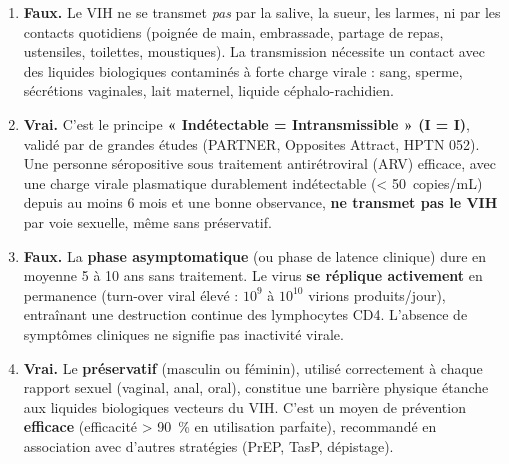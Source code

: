\documentclass[11pt]{article}
\begin{document}
\begin{corrige}
\begin{enumerate}
\item \textbf{Faux.} Le VIH ne se transmet \emph{pas} par la salive, la sueur, les larmes, ni par les contacts quotidiens (poignée de main, embrassade, partage de repas, ustensiles, toilettes, moustiques). La transmission nécessite un contact avec des liquides biologiques contaminés à forte charge virale : sang, sperme, sécrétions vaginales, lait maternel, liquide céphalo-rachidien.
\item \textbf{Vrai.} C'est le principe \textbf{« Indétectable = Intransmissible » (I = I)}, validé par de grandes études (PARTNER, Opposites Attract, HPTN 052). Une personne séropositive sous traitement antirétroviral (ARV) efficace, avec une charge virale plasmatique durablement indétectable (< \SI{50}{copies/mL}) depuis au moins 6 mois et une bonne observance, \textbf{ne transmet pas le VIH} par voie sexuelle, même sans préservatif.
\item \textbf{Faux.} La \textbf{phase asymptomatique} (ou phase de latence clinique) dure en moyenne 5 à 10 ans sans traitement. Le virus \textbf{se réplique activement} en permanence (turn-over viral élevé : $10^9$ à $10^{10}$ virions produits/jour), entraînant une destruction continue des lymphocytes CD4. L'absence de symptômes cliniques ne signifie pas inactivité virale.
\item \textbf{Vrai.} Le \textbf{préservatif} (masculin ou féminin), utilisé correctement à chaque rapport sexuel (vaginal, anal, oral), constitue une barrière physique étanche aux liquides biologiques vecteurs du VIH. C'est un moyen de prévention \textbf{efficace} (efficacité > \SI{90}{\%} en utilisation parfaite), recommandé en association avec d'autres stratégies (PrEP, TasP, dépistage).
\end{enumerate}
\end{corrige}
\end{document}

